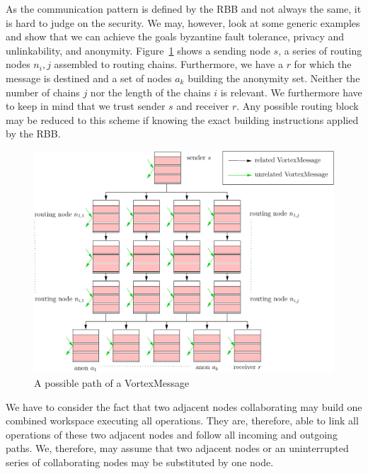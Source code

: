 \documentclass[acmsmall, screen, review]{acmart}
\begin{document}
As the communication pattern is defined by the RBB and not always the same, it is hard to judge on the security. We may, however, look at some generic examples and show that we can achieve the goals byzantine fault tolerance, privacy and unlinkability, and anonymity. Figure~\ref{fig:messagePaths} shows a sending node $s$, a series of routing nodes $n_i,j$ assembled to routing chains. Furthermore, we have a $r$ for which the message is destined and a set of nodes $a_k$ building the anonymity set. Neither the number of chains $j$ nor the length of the chains $i$ is relevant. We furthermore have to keep in mind that we trust sender $s$ and receiver $r$. Any possible routing block may be reduced to this scheme if knowing the exact building instructions applied by the RBB.

\begin{figure}[ht]
	\centering\includegraphics[width=0.7\columnwidth]{messagePaths}
	\caption{A possible path of a VortexMessage}
	\label{fig:messagePaths}
\end{figure}

We have to consider the fact that two adjacent nodes collaborating may build one combined workspace executing all operations. They are, therefore, able to link all operations of these two adjacent nodes and follow all incoming and outgoing paths. We, therefore, may assume that two adjacent nodes or an uninterrupted series of collaborating nodes may be substituted by one node.
\end{document}

